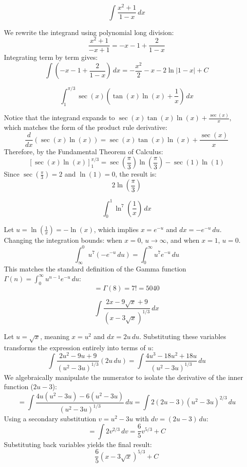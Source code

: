 \begin{questions}
    \question 
    \[ \int \frac{x^{2}+1}{1-x} \, dx \]
    \begin{solution}
        We rewrite the integrand using polynomial long division:
        \[ \frac{x^2+1}{-x+1} = -x - 1 + \frac{2}{1-x} \]
        Integrating term by term gives:
        \[ \int \left( -x - 1 + \frac{2}{1-x} \right) \, dx = -\frac{x^2}{2} - x - 2\ln|1-x| + C \]
    \end{solution}

    \question 
    \[ \int_{1}^{\pi/3} \sec(x)\left(\tan(x)\ln(x)+\frac{1}{x}\right) \, dx \]
    \begin{solution}
        Notice that the integrand expands to $\sec(x)\tan(x)\ln(x) + \frac{\sec(x)}{x}$, which matches the form of the product rule derivative:
        \[ \frac{d}{dx} \left( \sec(x)\ln(x) \right) = \sec(x)\tan(x)\ln(x) + \frac{\sec(x)}{x} \]
        Therefore, by the Fundamental Theorem of Calculus:
        \[ \left[ \sec(x)\ln(x) \right]_{1}^{\pi/3} = \sec\left(\frac{\pi}{3}\right)\ln\left(\frac{\pi}{3}\right) - \sec(1)\ln(1) \]
        Since $\sec(\frac{\pi}{3}) = 2$ and $\ln(1) = 0$, the result is:
        \[ 2\ln\left(\frac{\pi}{3}\right) \]
    \end{solution}

    \question 
    \[ \int_{0}^{1} \ln^{7}\left(\frac{1}{x}\right) \, dx \]
    \begin{solution}
        Let $u = \ln(\frac{1}{x}) = -\ln(x)$, which implies $x = e^{-u}$ and $dx = -e^{-u} \, du$. Changing the integration bounds: when $x=0$, $u \to \infty$, and when $x=1$, $u=0$.
        \[ \int_{\infty}^{0} u^7 (-e^{-u} \, du) = \int_{0}^{\infty} u^7 e^{-u} \, du \]
        This matches the standard definition of the Gamma function $\Gamma(n) = \int_{0}^{\infty} u^{n-1}e^{-u} \, du$:
        \[ = \Gamma(8) = 7! = 5040 \]
    \end{solution}

    \question 
    \[ \int \frac{2x-9\sqrt{x}+9}{(x-3\sqrt{x})^{1/3}} \, dx \]
    \begin{solution}
        Let $u = \sqrt{x}$, meaning $x = u^2$ and $dx = 2u \, du$. Substituting these variables transforms the expression entirely into terms of $u$:
        \[ \int \frac{2u^2-9u+9}{(u^2-3u)^{1/3}} (2u \, du) = \int \frac{4u^3-18u^2+18u}{(u^2-3u)^{1/3}} \, du \]
        We algebraically manipulate the numerator to isolate the derivative of the inner function ($2u-3$):
        \[ = \int \frac{4u(u^2-3u) - 6(u^2-3u)}{(u^2-3u)^{1/3}} \, du = \int 2(2u-3)(u^2-3u)^{2/3} \, du \]
        Using a secondary substitution $v = u^2-3u$ with $dv = (2u-3) \, du$:
        \[ = \int 2v^{2/3} \, dv = \frac{6}{5}v^{5/3} + C \]
        Substituting back variables yields the final result:
        \[ \frac{6}{5}(x-3\sqrt{x})^{5/3} + C \]
    \end{solution}


\end{questions}
